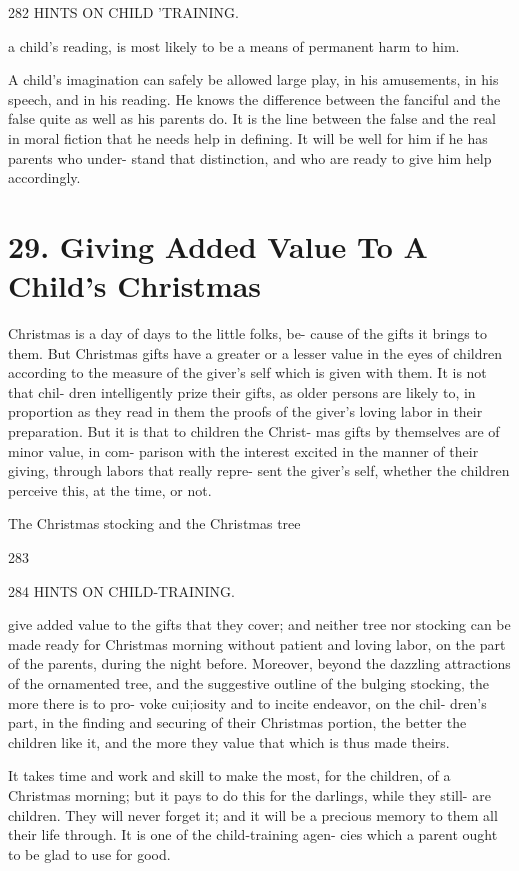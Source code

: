 \documentclass[
]{book}
\begin{document}
282 HINTS ON CHILD 'TRAINING.

a child's reading, is most likely to be a means of permanent harm to him.

A child's imagination can safely be allowed large play, in his amusements, in his speech, and in his reading. He knows the difference between the fanciful and the false quite as well as his parents do. It is the line between the false and the real in moral fiction that he needs help in defining. It will be well for him if he has parents who under- stand that distinction, and who are ready to give him help accordingly.

\hypertarget{giving-added-value-to-a-childs-christmas}{%
\chapter{29. Giving Added Value To A Child's Christmas}\label{giving-added-value-to-a-childs-christmas}}

Christmas is a day of days to the little folks, be- cause of the gifts it brings to them. But Christmas gifts have a greater or a lesser value in the eyes of children according to the measure of the giver's self which is given with them. It is not that chil- dren intelligently prize their gifts, as older persons are likely to, in proportion as they read in them the proofs of the giver's loving labor in their preparation. But it is that to children the Christ- mas gifts by themselves are of minor value, in com- parison with the interest excited in the manner of their giving, through labors that really repre- sent the giver's self, whether the children perceive this, at the time, or not.

The Christmas stocking and the Christmas tree

283

284 HINTS ON CHILD-TRAINING.

give added value to the gifts that they cover; and neither tree nor stocking can be made ready for Christmas morning without patient and loving labor, on the part of the parents, during the night before. Moreover, beyond the dazzling attractions of the ornamented tree, and the suggestive outline of the bulging stocking, the more there is to pro- voke cui;iosity and to incite endeavor, on the chil- dren's part, in the finding and securing of their Christmas portion, the better the children like it, and the more they value that which is thus made theirs.

It takes time and work and skill to make the most, for the children, of a Christmas morning; but it pays to do this for the darlings, while they still- are children. They will never forget it; and it will be a precious memory to them all their life through. It is one of the child-training agen- cies which a parent ought to be glad to use for good.
\end{document}
